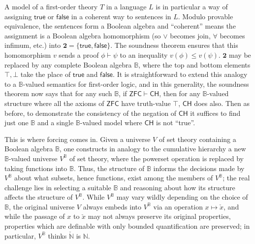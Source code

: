 \documentclass[a4paper,USenglish,cleveref, autoref]{lipics-v2019}
\newcommand{\B}{\mathbb{B}}
\theoremstyle{theorem}
\theoremstyle{definition}
\begin{document}
A model of a first-order theory $T$ in a language $L$ is in particular a way of assigning $\mathsf{true}$ or $\mathsf{false}$ in a coherent way to sentences in $L$. Modulo provable equivalence, the sentences form a Boolean algebra and ``coherent'' means the assignment is a Boolean algebra homomorphism (so $\lor$ becomes join, $\forall$ becomes infimum, etc.) into $\mathbf{2} = \{\mathsf{true}, \mathsf{false}\}$. The soundness theorem ensures that this homomorphism $v$ sends a proof $\phi \vdash \psi$ to an inequality $v(\phi) \leq v(\psi)$. $\mathbf{2}$ may be replaced by any complete Boolean algebra $\B$, where the top and bottom elements $\top, \bot$ take the place of $\mathsf{true}$ and $\mathsf{false}$. It is straightforward to extend this analogy to a $\B$-valued semantics for first-order logic, and in this generality, the soundness theorem now says that for any such $\B$, if $\mathsf{ZFC} \vdash \mathsf{CH}$, then for any $\B$-valued structure where all the axioms of $\mathsf{ZFC}$ have truth-value $\top$, $\mathsf{CH}$ does also. Then as before, to demonstrate the consistency of the negation of $\mathsf{CH}$ it suffices to find just one $\mathbb{B}$ and a single $\mathbb{B}$-valued model where $\mathsf{CH}$ is not ``true''.

This is where forcing comes in. Given a universe $V$ of set theory containing a Boolean algebra $\B$, one constructs in analogy to the cumulative hierarchy a new $\B$-valued universe $V^\B$ of set theory, where the powerset operation is replaced by taking functions into $\B$. Thus, the structure of $\B$ informs the decisions made by $V^\B$ about what subsets, hence functions, exist among the members of $V^\B$; the real challenge lies in selecting a suitable $\B$ and reasoning about how its structure affects the structure of $V^\B$. While $V^\B$ may vary wildly depending on the choice of $\B$, the original universe $V$ always embeds into $V^\B$ via an operation $x \mapsto \check{x}$, and while the passage of $x$ to $\check{x}$ may not always preserve its original properties, properties which are definable with only bounded quantification are preserved; in particular, $V^\B$ thinks $\check{\mathbb{N}}$ is $\mathbb{N}$.
\end{document}
